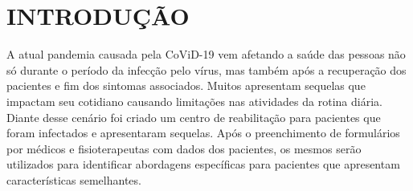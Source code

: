 \chapter{INTRODUÇÃO}

A atual pandemia causada pela CoViD-19 vem afetando a saúde das pessoas não só durante o período da infecção pelo vírus, mas também após a recuperação dos pacientes e fim dos sintomas associados. Muitos apresentam sequelas que impactam seu cotidiano causando limitações nas atividades da rotina diária. Diante desse cenário foi criado um centro de reabilitação para pacientes que foram infectados e apresentaram sequelas. Após o preenchimento de formulários por médicos e fisioterapeutas com dados dos pacientes, os mesmos serão utilizados para identificar abordagens específicas para pacientes que apresentam características semelhantes.